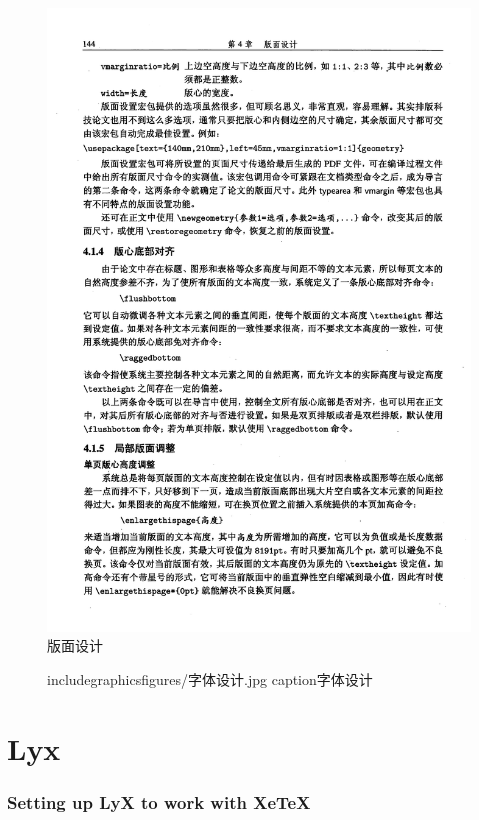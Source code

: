 \begin{figure}
\includegraphics{figures/版面设计.jpg}
      \caption{版面设计}
\end{figure}

\begin{figure}
	 includegraphics{figures/字体设计.jpg} 
	 caption{字体设计} 
\end{figure}


\chapter{Lyx}

\subsection{Setting up LyX to work with XeTeX}

